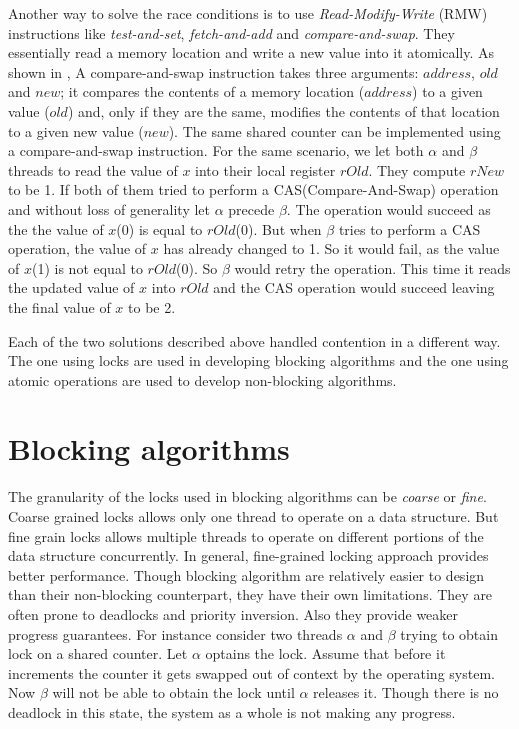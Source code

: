 Another way to solve the race conditions is to use \emph{Read-Modify-Write} (RMW) instructions like \emph{test-and-set}, \emph{fetch-and-add} and \emph{compare-and-swap}. They essentially read a memory location and write a new value into it atomically. As shown in , A compare-and-swap  instruction takes three arguments: $address$, $old$ and $new$; it compares the contents of a memory location ($address$) to a given value ($old$) and, only if they are the same, modifies the contents of that location to a given new value ($new$). The same shared counter can be implemented using a compare-and-swap instruction. For the same scenario, we let both $\alpha$ and $\beta$ threads to read the value of $x$ into their local register $rOld$. They compute $rNew$ to be 1. If both of them tried to perform a CAS(Compare-And-Swap) operation and without loss of generality let $\alpha$ precede $\beta$. The operation would succeed as the the value of $x$(0) is equal to $rOld$(0). But when $\beta$ tries to perform a CAS operation, the value of $x$ has already changed to 1. So it would fail, as the value of $x$(1) is not equal to $rOld$(0). So $\beta$ would retry the operation. This time it reads the updated value of $x$ into $rOld$ and the CAS operation would succeed leaving the final value of $x$ to be 2.

Each of the two solutions described above handled contention in a different way. The one using locks are used in developing blocking algorithms and the one using atomic operations are used to develop non-blocking algorithms.

\section{Blocking algorithms}
The granularity of the locks used in blocking algorithms can be \emph{coarse} or \emph{fine}. Coarse grained locks allows only one thread to operate on a data structure. But fine grain locks allows multiple threads to operate on different portions of the data structure concurrently. In general, fine-grained locking approach provides better performance. Though blocking algorithm are relatively easier to design than their non-blocking counterpart, they have their own limitations. They are often prone to deadlocks and priority inversion. Also they provide weaker progress guarantees. For instance consider two threads $\alpha$ and $\beta$ trying to obtain lock on a shared counter. Let $\alpha$ optains the lock. Assume that before it increments the counter it gets swapped out of context by the operating system. Now $\beta$ will not be able to obtain the lock until $\alpha$ releases it. Though there is no deadlock in this state, the system as a whole is not making any progress.

